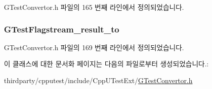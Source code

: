 G\+Test\+Convertor.\+h 파일의 165 번째 라인에서 정의되었습니다.

\subsubsection[{\texorpdfstring{G\+Test\+Flagstream\+\_\+result\+\_\+to}{GTestFlagstream_result_to}}]{ G\+Test\+Flagstream\+\_\+result\+\_\+to\hspace{0.3cm}{\ttfamily [private]}}\hypertarget{class_g_test_flags_that_allocate_memory_a94e2deac970be4b753de2b58d1e38573}{}\label{class_g_test_flags_that_allocate_memory_a94e2deac970be4b753de2b58d1e38573}


G\+Test\+Convertor.\+h 파일의 169 번째 라인에서 정의되었습니다.



이 클래스에 대한 문서화 페이지는 다음의 파일로부터 생성되었습니다.\+:\begin{DoxyCompactItemize}
\item 
thirdparty/cpputest/include/\+Cpp\+U\+Test\+Ext/\hyperlink{_g_test_convertor_8h}{G\+Test\+Convertor.\+h}\end{DoxyCompactItemize}

